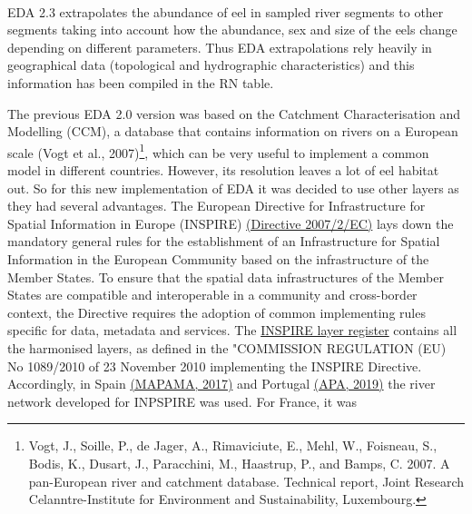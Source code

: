 \documentclass[pdftex,12pt,a4paper,svgnames]{report}\usepackage[]{graphicx}\usepackage[]{color}
\begin{document}
\begin{center}
\Huge\textsc{}\\
 \label{RN}
\end{center}
\vspace*{5cm}

EDA 2.3 extrapolates the abundance of eel in sampled river
segments to other segments taking into account how the abundance, sex and size
of the eels change depending on different parameters. Thus EDA extrapolations
rely heavily in geographical data (topological and hydrographic
characteristics) and this information has been compiled in the RN table.

The previous EDA 2.0 version was based on the Catchment Characterisation and
Modelling (CCM), a database that contains information on rivers on a European
scale (Vogt et al., 2007)\footnote{Vogt, J., Soille, P., de Jager, A.,
Rimaviciute, E., Mehl, W., Foisneau, S., Bodis, K., Dusart, J., Paracchini, M.,
Haastrup, P., and Bamps, C. 2007. A pan-European river and catchment database.
Technical report, Joint Research Celanntre-Institute for Environment and
Sustainability, Luxembourg.}, which can be very useful to implement a common
model in different countries. However,
its resolution leaves a lot of eel habitat out. So for this new implementation
of EDA it was decided to use other layers as they had several advantages.
The European Directive for Infrastructure for Spatial Information in
Europe (INSPIRE)
\href{https://eur-lex.europa.eu/legal-content/EN/TXT/PDF/?uri=CELEX:32007L0002&from=EN}{(Directive
2007/2/EC)} lays down the mandatory general rules for the establishment of an
Infrastructure for Spatial Information in the European Community based on the
infrastructure of the Member States. To ensure that the spatial data
infrastructures of the Member States are compatible and interoperable in a
community and cross-border context, the Directive requires the adoption of
common implementing rules specific for data, metadata and services. The
\href{https://data.europa.eu/euodp/en/data/dataset/jrc-10109-layer)}{INSPIRE
layer register} contains all the harmonised layers, as defined in the
"COMMISSION REGULATION (EU) No 1089/2010 of 23 November 2010 implementing the
INSPIRE Directive. Accordingly, in Spain
\href{https://sig.mapama.gob.es/Docs/PDFServiciosProd2/RiosPfafs.pdf}{(MAPAMA,
2017)} and Portugal
\href{https://sniambgeoportal.apambiente.pt/geoportal/catalog/search/resource/details.page?uuid={613E780E-052A-4183-99E5-6100D5663081}}{(APA,
2019)} the river network developed for INPSPIRE was used. For France, it was
\end{document}
